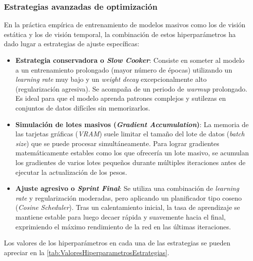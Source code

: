 \subsubsection*{Estrategias avanzadas de optimización}
\label{subsubsec:EstrategiasAvanzadasDeOptimizacion}
En la práctica empírica de entrenamiento de modelos masivos como los de visión estática y los de visión temporal, la combinación de estos hiperparámetros ha dado lugar a estrategias de ajuste específicas: 
\begin{itemize}
    \item \textbf{Estrategia conservadora o \textit{Slow Cooker}}: Consiste en someter al modelo a un entrenamiento prolongado (mayor número de épocas) utilizando un \textit{learning rate} muy bajo y un \textit{weight decay} excepcionalmente alto (regularización agresiva). Se acompaña de un periodo de \textit{warmup} prolongado. Es ideal para que el modelo aprenda patrones complejos y sutilezas en conjuntos de datos difíciles sin memorizarlos. 
    \item \textbf{Simulación de lotes masivos (\textit{Gradient Accumulation})}: La memoria de las tarjetas gráficas (\textit{VRAM}) suele limitar el tamaño del lote de datos (\textit{batch size}) que se puede procesar simultáneamente. Para lograr gradientes matemáticamente estables como los que ofrecería un lote masivo, se acumulan los gradientes de varios lotes pequeños durante múltiples iteraciones antes de ejecutar la actualización de los pesos. 
    \item \textbf{Ajuste agresivo o \textit{Sprint Final}}: Se utiliza una combinación de \textit{learning rate} y regularización moderadas, pero aplicando un planificador tipo coseno (\textit{Cosine Scheduler}). Tras un calentamiento inicial, la tasa de aprendizaje se mantiene estable para luego decaer rápida y suavemente hacia el final, exprimiendo el máximo rendimiento de la red en las últimas iteraciones.
\end{itemize}

Los valores de los hiperparámetros en cada una de las estrategias se pueden apreciar en la \autoref{tab:ValoresHiperparametrosEstrategias}.

